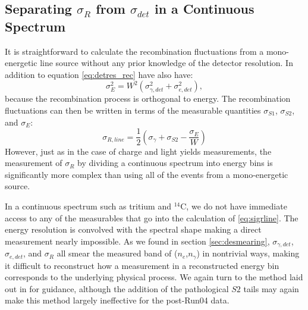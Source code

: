 \subsection{Separating $\sigma_R$ from $\sigma_{det}$ in a Continuous Spectrum}
It is straightforward to calculate the recombination fluctuations from a mono-energetic line source without any prior knowledge of the detector resolution. In addition to equation \ref{eq:detres_rec} have also have: 
\begin{equation}
\sigma_E^2=W^2\left(\sigma_{\gamma,det}^2+\sigma_{e,det}^2\right),
\end{equation}
because the recombination process is orthogonal to energy. The recombination fluctuations can then be written in terms of the measurable quantities $\sigma_{S1}$, $\sigma_{S2}$, and $\sigma_{E}$:
\begin{equation}\label{eq:sigrline}
\sigma_{R,line}=\frac{1}{2}\left(\sigma_{\gamma}+\sigma_{S2}-\frac{\sigma_{E}}{W}\right)
\end{equation}
However, just as in the case of charge and light yields measurements, the measurement of $\sigma_R$ by dividing a continuous spectrum into energy bins is significantly more complex than using all of the events from a mono-energetic source. 

In a continuous spectrum such as tritium and $^{14}$C, we do not have immediate access to any of the measurables that go into the calculation of \ref{eq:sigrline}. The energy resolution is convolved with the spectral shape making a direct measurement nearly impossible. As we found in section \ref{sec:desmearing}, $\sigma_{\gamma,det}$, $\sigma_{e,det}$, and $\sigma_{R}$ all smear the measured band of ($n_{e}$,$n_{\gamma}$) in nontrivial ways, making it difficult to reconstruct how a measurement in a reconstructed energy bin corresponds to the underlying physical process. We again turn to the method laid out in \cite{attila} for guidance, although the addition of the pathological $S2$ tails may again make this method largely ineffective for the post-Run04 data. 

